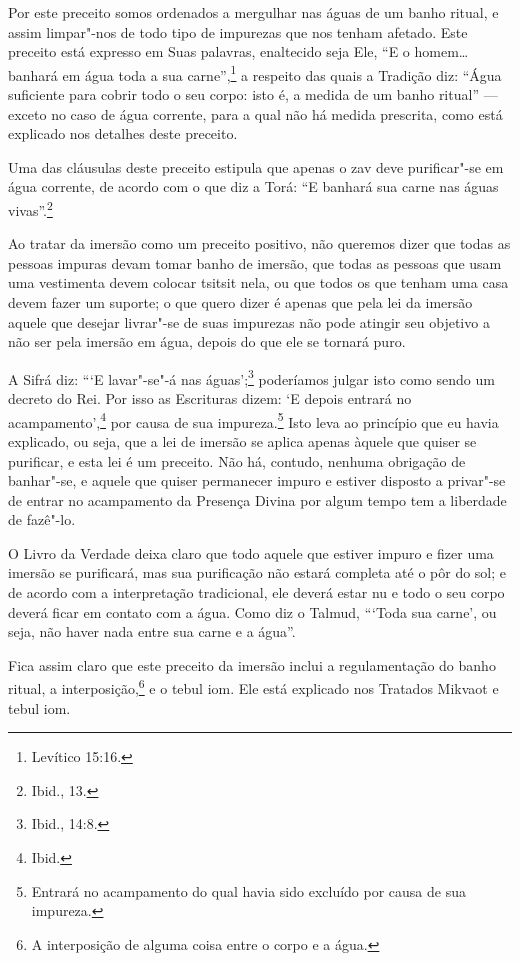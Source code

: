 \begin{multicols}{2}
Por este preceito somos ordenados a mergulhar nas águas de um banho
ritual, e assim limpar"-nos de todo tipo de impurezas que nos tenham
afetado. Este preceito está expresso em Suas palavras, enaltecido seja
Ele, ``E o homem\ldots{} banhará em água toda a sua carne'',\footnote{Levítico
15:16.} a respeito das quais a Tradição diz: ``Água suficiente para
cobrir todo o seu corpo: isto é, a medida de um banho ritual'' ---
exceto no caso de água corrente, para a qual não há medida prescrita,
como está explicado nos detalhes deste preceito.

Uma das cláusulas deste preceito estipula que apenas o zav\starr{} deve
purificar"-se em água corrente, de acordo com o que diz a Torá\starr: ``E
banhará sua carne nas águas vivas''.\footnote{Ibid., 13.}

Ao tratar da imersão como um preceito positivo, não queremos dizer que
todas as pessoas impuras devam tomar banho de imersão, que todas
as pessoas que usam uma vestimenta devem colocar tsitsit\starr{} nela, ou
que todos os que tenham uma casa devem fazer um suporte; o que quero
dizer é apenas que pela lei da imersão aquele que desejar livrar"-se de
suas impurezas não pode atingir seu objetivo a não ser pela imersão em
água, depois do que ele se tornará puro.

A Sifrá\starr{} diz: ```E lavar"-se"-á nas águas';\footnote{Ibid., 14:8.} poderíamos
julgar isto como sendo um decreto do Rei. Por isso as Escrituras dizem:
`E depois entrará no acampamento',\footnote{Ibid.} por causa de sua
impureza.\footnote{Entrará no acampamento do qual havia sido excluído por causa de sua
  impureza.} Isto leva ao princípio que eu havia
explicado, ou seja, que a lei de imersão se aplica apenas àquele que
quiser se purificar, e esta lei é um preceito. Não há, contudo, nenhuma
obrigação de banhar"-se, e aquele que quiser permanecer impuro e estiver
disposto a privar"-se de entrar no acampamento da Presença Divina por
algum tempo tem a liberdade de fazê"-lo.

O Livro da Verdade deixa claro que todo aquele que estiver impuro e
fizer uma imersão se purificará, mas sua purificação não estará completa
até o pôr do sol; e de acordo com a interpretação tradicional, ele
deverá estar nu e todo o seu corpo deverá ficar em contato com a água.
Como diz o Talmud\starr, ```Toda sua carne', ou seja, não haver nada entre sua
carne e a água''.

Fica assim claro que este preceito da imersão inclui a regulamentação
do banho ritual, a interposição,\footnote{A interposição de alguma coisa entre o corpo e a água.} e o tebul iom\starr. Ele está explicado nos Tratados Mikvaot\starr{} e tebul iom\starr.


\end{multicols}
